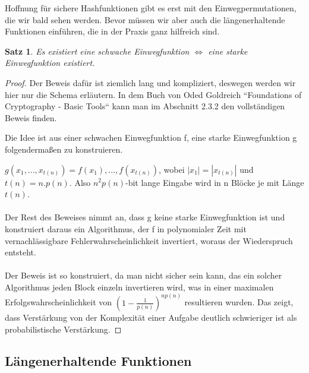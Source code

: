 \documentclass[12pt,a4paper]{article}
\newtheorem{theorem}{Satz}[section]
\theoremstyle{definition}
\begin{document}
    Hoffnung für sichere Hashfunktionen gibt es erst mit den Einwegpermutationen, die wir bald sehen werden. Bevor
    müssen wir aber auch die längenerhaltende Funktionen einführen, die in der Praxis ganz hilfreich sind.


    \begin{theorem}
        Es existiert eine schwache Einwegfunktion $\Leftrightarrow$ eine starke Einwegfunktion existiert.
    \end{theorem}
    \begin{proof}
        Der Beweis dafür ist ziemlich lang und kompliziert, deswegen werden wir hier nur die Schema erläutern. In
        dem Buch von Oded Goldreich ``Foundations of Cryptography - Basic Tools`` kann man im Abschnitt 2.3.2 den
        vollständigen Beweis finden.

        Die Idee ist aus einer schwachen Einwegfunktion f, eine starke Einwegfunktion g folgendermaßen zu konstruieren.

        $g(x_1, ..., x_{t(n)}) = f(x_1),...,f(x_{t(n)})$, wobei $|x_1| = |x_{t(n)}|$ und $t(n) = n . p(n)$. Also
        $n^2p(n)$-bit lange Eingabe wird in n Blöcke je mit Länge $t(n)$. \\ \\

        Der Rest des Beweises nimmt an, dass g keine starke Einwegfunktion ist und konstruiert daraus ein Algorithmus,
        der f in polynomialer Zeit mit vernachlässigbare Fehlerwahrscheinlichkeit invertiert, woraus der Wiederspruch
        entsteht. \\ \\

        Der Beweis ist so konstruiert, da man nicht sicher sein kann, das ein solcher Algorithmus jeden Block
        einzeln invertieren wird, was in einer maximalen Erfolgswahrscheinlichkeit von $(1 - \frac{1}{p(n)})^{np(n)}$
        resultieren wurden. Das zeigt, dass Verstärkung von der Komplexität einer Aufgabe deutlich schwieriger ist
        als probabilistische Verstärkung.
    \end{proof}

    \subsection{Längenerhaltende Funktionen}
\end{document}
